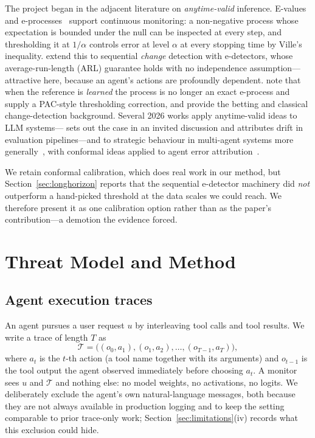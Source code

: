 \documentclass[preprint,12pt,authoryear]{elsarticle}
\theoremstyle{definition}
\newcommand{\Tcal}{\mathcal{T}}
\begin{document}
The project began in the adjacent literature on \emph{anytime-valid} inference.
E-values and e-processes~\citep{vovk2021evalues,ramdas2023gametheoretic,
grunwald2024safetesting} support continuous monitoring: a non-negative process
whose expectation is bounded under the null can be inspected at every step, and
thresholding it at $1/\alpha$ controls error at level $\alpha$ at every stopping
time by Ville's inequality. \citet{shin2023edetectors} extend this to sequential
\emph{change} detection with e-detectors, whose average-run-length (ARL) guarantee
holds with no independence assumption---attractive here, because an agent's
actions are profoundly dependent. \citet{sadhuka2025evaluator} note that when the
reference is \emph{learned} the process is no longer an exact e-process and supply
a PAC-style thresholding correction, and
\citet{waudbysmith2023betting,page1954cusum,lorden1971procedures} provide the
betting and classical change-detection background.
Several 2026 works apply anytime-valid ideas to LLM
systems---\citet{xie2026sequential} sets out the case in an invited discussion
and \citet{li2026whodrifted} attributes drift in evaluation pipelines---and to
strategic behaviour in multi-agent systems more
generally~\citep{gauthier2026strategic}, with conformal ideas applied to agent
error attribution~\citep{feng2026conformalattribution}.

We retain conformal calibration, which does real work in our method, but
Section~\ref{sec:longhorizon} reports that the sequential e-detector machinery
did \emph{not} outperform a hand-picked threshold at the data scales we could
reach. We therefore present it as one calibration option rather than as the
paper's contribution---a demotion the evidence forced.

\section{Threat Model and Method}\label{sec:setup}

\subsection{Agent execution traces}

An agent pursues a user request $u$ by interleaving tool calls and tool results.
We write a trace of length $T$ as
\begin{equation}
\Tcal = \big( (o_0, a_1), (o_1, a_2), \dots, (o_{T-1}, a_T) \big),
\end{equation}
where $a_t$ is the $t$-th action (a tool name together with its arguments) and
$o_{t-1}$ is the tool output the agent observed immediately before choosing
$a_t$. A monitor sees $u$ and $\Tcal$ and nothing else: no model weights, no
activations, no logits. We deliberately exclude the agent's own
natural-language messages, both because they are not always available in
production logging and to keep the setting comparable to prior trace-only
work; Section~\ref{sec:limitations}(iv) records what this exclusion could hide.
\end{document}
